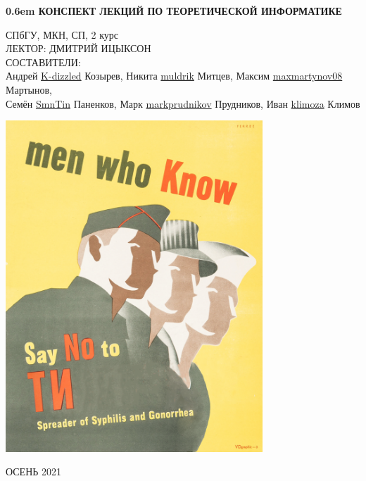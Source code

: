 \documentclass[12pt,letterpaper]{report}
\theoremstyle{definition}
\begin{document}
\clearpage
\newcommand\nbvspace[1][3]{\vspace*{\stretch{#1}}}
\newcommand\nbstretchyspace{\spaceskip0.5em plus 0.25em minus 0.25em}
\newcommand{\nbtitlestretch}{\spaceskip0.6em}
\pagestyle{empty}
\begin{center}
\bfseries
\nbvspace[1]
\Huge
{\nbtitlestretch\huge
КОНСПЕКТ ЛЕКЦИЙ ПО ТЕОРЕТИЧЕСКОЙ ИНФОРМАТИКЕ}

\nbvspace[1]
\normalsize

СПбГУ, МКН, СП, 2 курс\\
ЛЕКТОР: ДМИТРИЙ ИЦЫКСОН
\nbvspace[1]
\\
\Large СОСТАВИТЕЛИ:\\[0.5em]
\footnotesize
Андрей \href{https://github.com/K-dizzled}{K-dizzled} Козырев,
Никита  \href{https://github.com/muldrik}{muldrik} Митцев,
Максим \href{https://github.com/maxmartynov08}{maxmartynov08} Мартынов,\\
Семён \href{https://github.com/SmnTin}{SmnTin} Паненков,
Марк \href{https://github.com/markprudnikov}{markprudnikov} Прудников,
Иван \href{https://github.com/klimoza}{klimoza} Климов

\nbvspace[2]

\includegraphics[width=3.8in]{./images/TICover.png}
\nbvspace[3]
\normalsize

\large
ОСЕНЬ 2021
\nbvspace[1]
\end{center}
\end{document}
